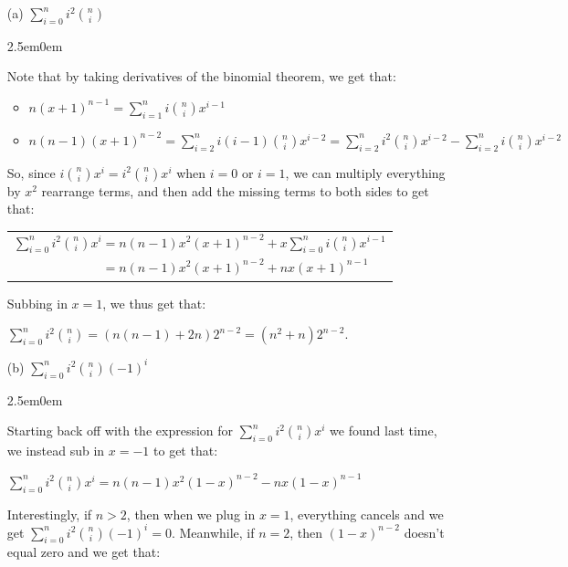 \documentclass{book}
\newcommand{\exOne}{%
   \color{Purple}%
   \fontsize{13}{15}\selectfont%
}
\newcommand{\exTwo}{%
   \color{Purple}%
   \fontsize{13}{15}\selectfont%
}
\newenvironment{myIndent}{%
   \begin{adjustwidth}{2.5em}{0em}%
}{%
   \end{adjustwidth}%
}
\newcommand{\retTwo}{\hfill\bigbreak}
\begin{document}
\begin{enumerate}
   \item[(a)] $\sum\limits_{i=0}^n i^2\binom{n}{i}$
   
   \begin{myIndent}\exOne
      Note that by taking derivatives of the binomial theorem, we get that:\\ [-18pt]
      {\exTwo\begin{itemize}
         \item $n(x+1)^{n-1} = \sum\limits_{i=1}^{n} i\binom{n}{i}x^{i-1}$
         \item $ n(n-1)(x+1)^{n-2} = \sum\limits_{i=2}^{n} i(i-1)\binom{n}{i} x^{i-2} = \sum\limits_{i=2}^ni^2\binom{n}{i}x^{i-2} - \sum\limits_{i=2}^ni\binom{n}{i}x^{i-2}$\retTwo
      \end{itemize}}

      So, since $i\binom{n}{i}x^{i} = i^2\binom{n}{i}x^{i}$ when $i = 0$ or $i = 1$, we can multiply everything by $x^2$ rearrange terms, and then add the missing terms to both sides to get that:
      
      {\centering 
      \begin{tabular}{l}
         $\sum\limits_{i=0}^n i^2\binom{n}{i}x^i = n(n-1)x^2(x+1)^{n-2} + x\sum\limits_{i=0}^n i\binom{n}{i}x^{i-1}$\\ $\phantom{\sum\limits_{i=0}^n i^2\binom{n}{i}x^i}= n(n-1)x^2(x+1)^{n-2} + nx(x+1)^{n-1}$
      \end{tabular}\retTwo\par}

      Subbing in $x = 1$, we thus get that:
      
      {\centering $\sum\limits_{i=0}^n i^2\binom{n}{i} = (n(n-1) + 2n)2^{n-2} = (n^2 + n)2^{n-2}$.\retTwo\par}
   \end{myIndent}

   \item[(b)] $\sum\limits_{i=0}^n i^2\binom{n}{i}(-1)^i$
   
   \begin{myIndent}\exOne
      Starting back off with the expression for $\sum\limits_{i=0}^n i^2\binom{n}{i}x^i$ we found last time, we instead sub in $x = -1$ to get that:

      {\centering $\sum\limits_{i=0}^n i^2\binom{n}{i}x^i = n(n-1)x^2(1-x)^{n-2} - nx(1-x)^{n-1}$ \retTwo\par}



      Interestingly, if $n > 2$, then when we plug in $x = 1$, everything cancels and we get $\sum\limits_{i=0}^n i^2\binom{n}{i}(-1)^i = 0$. Meanwhile, if $n = 2$, then $(1 - x)^{n-2}$ doesn't equal zero and we get that:


\end{myIndent}
\end{enumerate}
\end{document}

